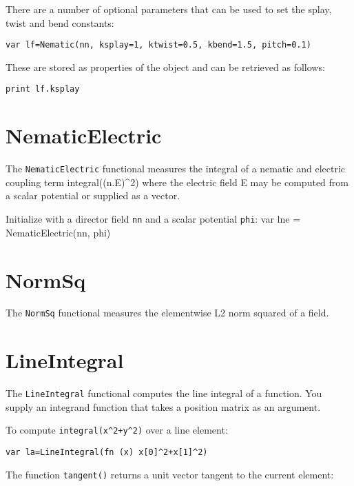 There are a number of optional parameters that can be used to set the
splay, twist and bend constants:

\begin{lstlisting}
var lf=Nematic(nn, ksplay=1, ktwist=0.5, kbend=1.5, pitch=0.1)
\end{lstlisting}

These are stored as properties of the object and can be retrieved as
follows:

\begin{lstlisting}
print lf.ksplay
\end{lstlisting}

\hypertarget{nematicelectric}{%
\section{NematicElectric}\label{nematicelectric}}

The \texttt{NematicElectric} functional measures the integral of a
nematic and electric coupling term integral((n.E)\^{}2) where the
electric field E may be computed from a scalar potential or supplied as
a vector.

Initialize with a director field \texttt{nn} and a scalar potential
\texttt{phi}: var lne = NematicElectric(nn, phi)

\hypertarget{normsq}{%
\section{NormSq}\label{normsq}}

The \texttt{NormSq} functional measures the elementwise L2 norm squared
of a field.

\hypertarget{lineintegral}{%
\section{LineIntegral}\label{lineintegral}}

The \texttt{LineIntegral} functional computes the line integral of a
function. You supply an integrand function that takes a position matrix
as an argument.

To compute \texttt{integral(x\^{}2+y\^{}2)} over a line element:

\begin{lstlisting}
var la=LineIntegral(fn (x) x[0]^2+x[1]^2)
\end{lstlisting}

The function \texttt{tangent()} returns a unit vector tangent to the
current element:

